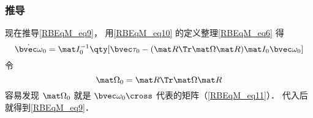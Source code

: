 \subsubsection{推导}
现在推导\autoref{RBEqM_eq9}， 用\autoref{RBEqM_eq10} 的定义整理\autoref{RBEqM_eq6} 得
\begin{equation}
\dot{\bvec \omega}_0 = \mat I_0^{-1} \qty[\bvec \tau_0  - (\mat R\Tr\mat\Omega\mat R) \mat I_0 \bvec\omega_0]
\end{equation}
令
\begin{equation}
\mat\Omega_0 = \mat R\Tr\mat\Omega\mat R
\end{equation}
容易发现 $\mat\Omega_0$ 就是 $\bvec\omega_0\cross$ 代表的矩阵（\autoref{RBEqM_eq11}）． 代入后就得到\autoref{RBEqM_eq9}．
